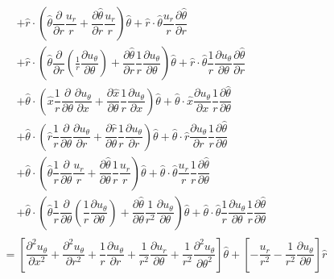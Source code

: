 \documentclass{kthreport}
\begin{document}
\begin{eqnarray}
\begin{split}
	& + \hat{r}\cdot\left( \hat{\theta}\dfrac{\partial }{\partial r}\dfrac{u_{r}}{r}  + \dfrac{\partial \hat{\theta}}{\partial r}\dfrac{u_{r}}{r} \right)\hat{\theta}  + \hat{r}\cdot\hat{\theta}\dfrac{u_{r}}{r}\dfrac{\partial \hat{\theta}}{\partial r}  \\
	&+ \hat{r}\cdot\left(\hat{\theta}\dfrac{\partial }{\partial r}\left(\frac{1}{r}\dfrac{\partial u_{\theta}}{\partial \theta}\right) + \dfrac{\partial \hat{\theta}}{\partial r}\dfrac{1}{r}\dfrac{\partial u_{\theta}}{\partial \theta} \right)\hat{\theta} + \hat{r}\cdot\hat{\theta}\dfrac{1}{r}\dfrac{\partial u_{\theta}}{\partial \theta}\dfrac{\partial \hat{\theta}}{\partial r}\\
	&+ \hat{\theta}\cdot\left(\hat{x}\dfrac{1}{r}\dfrac{\partial }{\partial \theta}\dfrac{\partial u_{\theta}}{\partial x}  + \dfrac{\partial \hat{x}}{\partial \theta}\dfrac{1}{r}\dfrac{\partial u_{\theta}}{\partial x} \right)\hat{\theta} + \hat{\theta}\cdot\hat{x}\dfrac{\partial u_{\theta}}{\partial x}\dfrac{1}{r}\dfrac{\partial \hat{\theta}}{\partial \theta} \\
	&+ \hat{\theta}\cdot\left(	\hat{r}\dfrac{1}{r}\dfrac{\partial}{\partial \theta}\dfrac{\partial u_{\theta}}{\partial r}	+ \dfrac{\partial \hat{r}}{\partial \theta}\dfrac{1}{r}\dfrac{\partial u_{\theta}}{\partial r} \right)\hat{\theta} + \hat{\theta}\cdot\hat{r}\dfrac{\partial u_{\theta}}{\partial r}\dfrac{1}{r}\dfrac{\partial \hat{\theta}}{\partial \theta} \\
	& + \hat{\theta}\cdot\left( \hat{\theta}\dfrac{1}{r}\dfrac{\partial }{\partial \theta}\dfrac{u_{r}}{r}	+ \dfrac{\partial \hat{\theta}}{\partial \theta}\dfrac{1}{r}\dfrac{u_{r}}{r}  \right)\hat{\theta}  + \hat{\theta}\cdot\hat{\theta}\dfrac{u_{r}}{r}\dfrac{1}{r}\dfrac{\partial \hat{\theta}}{\partial \theta} \\
	&+ \hat{\theta}\cdot\left(\hat{\theta}\dfrac{1}{r}\dfrac{\partial }{\partial \theta}\left(\dfrac{1}{r}\dfrac{\partial u_{\theta}}{\partial \theta}\right)
	+ \dfrac{\partial \hat{\theta}}{\partial \theta}\dfrac{1}{r^{2}}\dfrac{\partial u_{\theta}}{\partial \theta} \right) \hat{\theta} + \hat{\theta}\cdot\hat{\theta}\dfrac{1}{r}\dfrac{\partial u_{\theta}}{\partial \theta}\dfrac{1}{r}\dfrac{\partial \hat{\theta}}{\partial \theta}
\end{split} \nonumber \\
	= \left[\dfrac{\partial^{2}u_{\theta}}{\partial x^{2}} + \dfrac{\partial^{2}u_{\theta}}{\partial r^{2}} + \dfrac{1}{r}\dfrac{\partial u_{\theta}}{\partial r} + \dfrac{1}{r^{2}}\dfrac{\partial u_{r}}{\partial \theta}   + \dfrac{1}{r^{2}}\dfrac{\partial^{2} u_{\theta}}{\partial \theta^{2}}	\right]\hat{\theta}  + \left[- \dfrac{u_{r}}{r^{2}}  - \dfrac{1}{r^{2}}\dfrac{\partial u_{\theta}}{\partial \theta}  \right]\hat{r}
\end{eqnarray}
\end{document}
